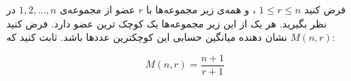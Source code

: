 \EXERCISE
فرض کنيد 
$1 \leq r \leq n$
، و همه‌ی زير مجموعه‌ها با 
$r$
 عضو از مجموعه‌ی 
${1, 2, ..., n}$
  در نظر بگيريد. هر يک از اين زير مجموعه‌ها يک کوچک ترين عضو دارد. فرض کنيد 
$M(n, r)$
  نشان دهنده ميانگين حسابی اين کوچکترين عددها باشد. ثابت کنيد که:
  
$$M(n, r) = \frac{n+1}{r+1}$$